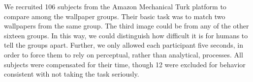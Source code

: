 We recruited 106 subjects from the Amazon Mechanical Turk platform to compare among the wallpaper groups. Their basic task was to match two wallpapers from the same group. The third image could be from any of the other sixteen groups. In this way, we could distinguish how difficult it is for humans to tell the groups apart. Further, we only allowed each participant five seconds, in order to force them to rely on perceptual, rather than analytical, processes. All subjects were compensated for their time, though 12 were excluded for behavior consistent with not taking the task seriously. 
